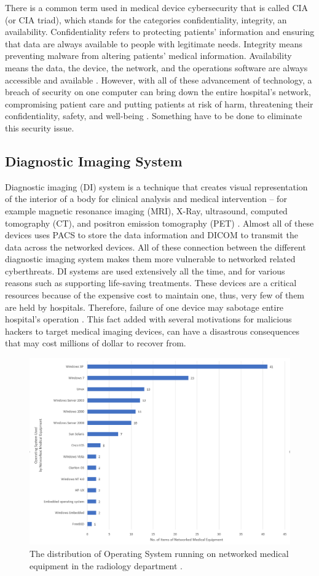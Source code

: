 \documentclass[pdf,bookmarks,colorlinks=true]{IEEEtran}
\begin{document}
There is a common term used in medical device cybersecurity that is called CIA (or CIA triad), which stands for the categories confidentiality, integrity, an availability. Confidentiality refers to protecting patients' information and ensuring that data are always available to people with legitimate needs. Integrity means preventing malware from altering patients' medical information. Availability means the data, the device, the network, and  the operations software are always accessible and available \cite{mahler2018know}. 
However, with all of these advancement of technology, a breach of security on one computer can bring down the entire hospital's network, compromising patient care and putting patients at risk of harm, threatening their confidentiality, safety, and well-being \cite{ferrara2019cybersecurity}. Something have to be done to eliminate this security issue.

\subsection{Diagnostic Imaging System}
Diagnostic imaging (DI) system is a technique that creates visual representation of the interior of a body for clinical analysis and medical intervention -- for example magnetic resonance imaging (MRI), X-Ray, ultrasound, computed tomography (CT), and positron emission tomography (PET) \cite{InformationSecurityonDiagnosticImagingSystem}. Almost all of these devices uses PACS to store the data information and DICOM to transmit the data across the networked devices. All of these connection between the different diagnostic imaging system makes them more vulnerable to networked related cyberthreats. DI systems are used extensively all the time, and for various reasons such as supporting life-saving treatments. These devices are a critical resources because of the expensive cost to maintain one, thus, very few of them are held by hospitals. Therefore, failure of one device may sabotage entire hospital's operation \cite{mahler2018know}. This fact added with several motivations for malicious hackers to target medical imaging devices, can have a disastrous consequences that may cost millions of dollar to recover from.

\begin{figure}[tph]
	\centering
	\includegraphics[width=0.7\linewidth]{OSonRadiology}
	\caption{The distribution of Operating System running on networked medical equipment in the radiology department \cite{moses2015lack}.}
	\label{fig:osonradiology}
\end{figure}
\end{document}
